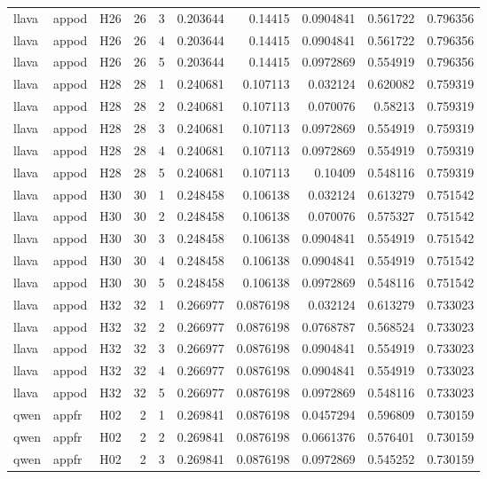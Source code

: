 \begin{longtable}{lllrrrrrrr}
llava & appod & H26 & 26 & 3 & 0.203644 & 0.14415 & 0.0904841 & 0.561722 & 0.796356 \\
llava & appod & H26 & 26 & 4 & 0.203644 & 0.14415 & 0.0904841 & 0.561722 & 0.796356 \\
llava & appod & H26 & 26 & 5 & 0.203644 & 0.14415 & 0.0972869 & 0.554919 & 0.796356 \\
llava & appod & H28 & 28 & 1 & 0.240681 & 0.107113 & 0.032124 & 0.620082 & 0.759319 \\
llava & appod & H28 & 28 & 2 & 0.240681 & 0.107113 & 0.070076 & 0.58213 & 0.759319 \\
llava & appod & H28 & 28 & 3 & 0.240681 & 0.107113 & 0.0972869 & 0.554919 & 0.759319 \\
llava & appod & H28 & 28 & 4 & 0.240681 & 0.107113 & 0.0972869 & 0.554919 & 0.759319 \\
llava & appod & H28 & 28 & 5 & 0.240681 & 0.107113 & 0.10409 & 0.548116 & 0.759319 \\
llava & appod & H30 & 30 & 1 & 0.248458 & 0.106138 & 0.032124 & 0.613279 & 0.751542 \\
llava & appod & H30 & 30 & 2 & 0.248458 & 0.106138 & 0.070076 & 0.575327 & 0.751542 \\
llava & appod & H30 & 30 & 3 & 0.248458 & 0.106138 & 0.0904841 & 0.554919 & 0.751542 \\
llava & appod & H30 & 30 & 4 & 0.248458 & 0.106138 & 0.0904841 & 0.554919 & 0.751542 \\
llava & appod & H30 & 30 & 5 & 0.248458 & 0.106138 & 0.0972869 & 0.548116 & 0.751542 \\
llava & appod & H32 & 32 & 1 & 0.266977 & 0.0876198 & 0.032124 & 0.613279 & 0.733023 \\
llava & appod & H32 & 32 & 2 & 0.266977 & 0.0876198 & 0.0768787 & 0.568524 & 0.733023 \\
llava & appod & H32 & 32 & 3 & 0.266977 & 0.0876198 & 0.0904841 & 0.554919 & 0.733023 \\
llava & appod & H32 & 32 & 4 & 0.266977 & 0.0876198 & 0.0904841 & 0.554919 & 0.733023 \\
llava & appod & H32 & 32 & 5 & 0.266977 & 0.0876198 & 0.0972869 & 0.548116 & 0.733023 \\
qwen & appfr & H02 & 2 & 1 & 0.269841 & 0.0876198 & 0.0457294 & 0.596809 & 0.730159 \\
qwen & appfr & H02 & 2 & 2 & 0.269841 & 0.0876198 & 0.0661376 & 0.576401 & 0.730159 \\
qwen & appfr & H02 & 2 & 3 & 0.269841 & 0.0876198 & 0.0972869 & 0.545252 & 0.730159 \\

\end{longtable}
